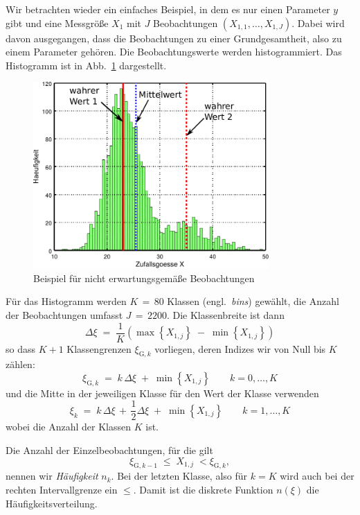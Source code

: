 Wir betrachten wieder ein einfaches Beispiel, in dem es nur einen Parameter $y$ gibt und eine 
Messgröße $X_1$ mit $J$ Beobachtungen $(X_{1,1},\dots,X_{1,J})$.
Dabei wird davon ausgegangen, dass die Beobachtungen zu einer Grundgesamtheit, also zu einem Parameter gehören.
Die Beobachtungswerte werden histogrammiert. Das Histogramm ist in Abb.~\ref{biasExampleKap3} dargestellt.
\begin{figure}
\begin{center}
\includegraphics[width=90mm]{03_vorlesung/media/learn_robust.pdf}
\caption{Beispiel für nicht erwartungsgemäße Beobachtungen}
\label{biasExampleKap3}
\end{center}
\end{figure}
Für das Histogramm werden $K \, = \, 80$ Klassen (engl.\ \textsl{bins}) gewählt, die Anzahl der Beobachtungen umfasst $J \, = \, 2200$.
Die Klassenbreite ist dann
\begin{equation}
\Delta \xi \; = \; \frac{1}{K} \left( \max \left\{X_{1,j}\right\} \; - \; \min \left\{X_{1,j}\right\} \right)
\end{equation}
so dass $K+1$ Klassengrenzen $\xi_{\mathrm{G}, k}$ vorliegen,
deren Indizes wir von Null bis $K$ zählen:
\begin{equation}
 \xi_{\mathrm{G}, k} \; = \; k \, \Delta \xi \; + \; \min \left\{X_{1,j}\right\}
\qquad k = 0, \dots, K
\label{limkthbin}
\end{equation}
und die Mitte in der jeweiligen Klasse für den Wert der Klasse verwenden
\begin{equation}
 \xi_k \; = \; k \, \Delta \xi  \, + \, \frac{1}{2} \Delta \xi  \; + \; \min \left\{X_{1,j}\right\}
\qquad k = 1, \dots, K
\label{kthbin}
\end{equation}
wobei die Anzahl der Klassen $K$ ist.

Die Anzahl der Einzelbeobachtungen, für die gilt
\begin{equation}
\xi_{\mathrm{G}, k-1} \; \leq \; X_{1,j} \; <  \xi_{\mathrm{G}, k},
\end{equation}
nennen wir \textsl{Häufigkeit} $n_k$. Bei der letzten Klasse, also für
$k = K$ wird auch bei der rechten Intervallgrenze ein $\leq$.
Damit ist die diskrete Funktion $n(\xi)$ die Häufigkeitsverteilung.

